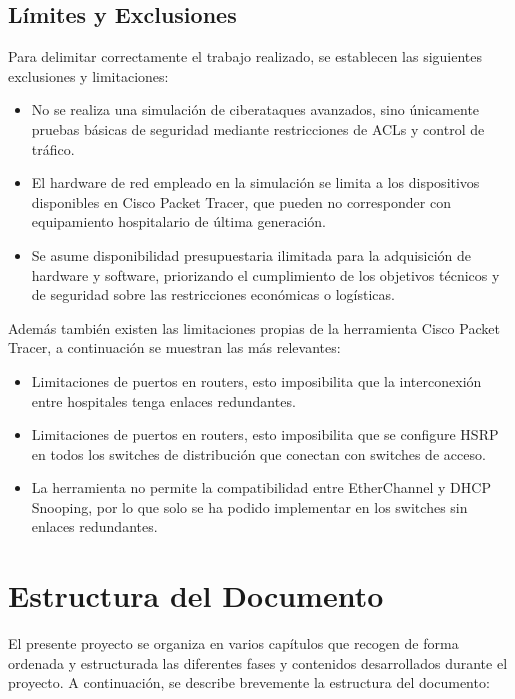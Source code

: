 \subsection{Límites y Exclusiones}
\label{subsec:limites}
Para delimitar correctamente el trabajo realizado, se establecen las siguientes exclusiones y limitaciones:
\begin{itemize}
    \item No se realiza una simulación de ciberataques avanzados, sino únicamente pruebas básicas de seguridad mediante restricciones de \acs{ACL}s y control de tráfico.
    \item El hardware de red empleado en la simulación se limita a los dispositivos disponibles en Cisco Packet Tracer, que pueden no corresponder con equipamiento 
    hospitalario de última generación.
    \item Se asume disponibilidad presupuestaria ilimitada para la adquisición de hardware y software, priorizando el cumplimiento de los objetivos técnicos y de 
    seguridad sobre las restricciones económicas o logísticas.
\end{itemize}
Además también existen las limitaciones propias de la herramienta Cisco Packet Tracer, a continuación se muestran las más relevantes:
\begin{itemize}
    \item Limitaciones de puertos en routers, esto imposibilita que la interconexión entre hospitales tenga enlaces redundantes.
    \item Limitaciones de puertos en routers, esto imposibilita que se configure HSRP en todos los switches de distribución que conectan con switches de acceso.
    \item La herramienta no permite la compatibilidad entre EtherChannel y DHCP Snooping, por lo que solo se ha podido implementar en los switches sin enlaces redundantes.
\end{itemize}

\section{Estructura del Documento}
El presente proyecto se organiza en varios capítulos que recogen de forma ordenada y estructurada las diferentes fases y contenidos desarrollados durante el proyecto. 
A continuación, se describe brevemente la estructura del documento:

